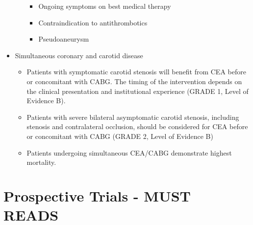 \documentclass[
]{book}
\begin{document}
\begin{itemize}
\begin{itemize}
    \begin{itemize}
    \item
      Ongoing symptoms on best medical therapy
    \item
      Contraindication to antithrombotics
    \item
      Pseudoaneurysm
    \end{itemize}
  \end{itemize}
\item
  Simultaneous coronary and carotid disease

  \begin{itemize}
  \item
    Patients with symptomatic carotid stenosis will benefit from CEA
    before or concomitant with CABG. The timing of the intervention
    depends on the clinical presentation and institutional
    experience (GRADE 1, Level of Evidence B).
  \item
    Patients with severe bilateral asymptomatic carotid stenosis,
    including stenosis and contralateral occlusion, should be
    considered for CEA before or concomitant with CABG (GRADE 2,
    Level of Evidence B)
  \item
    Patients undergoing simultaneous CEA/CABG demonstrate highest
    mortality. \citet{naylorSystematicReviewOutcomes2003}
  \end{itemize}
\end{itemize}

\hypertarget{prospective-trials---must-reads}{%
\section{Prospective Trials - MUST READS}\label{prospective-trials---must-reads}}
\end{document}
